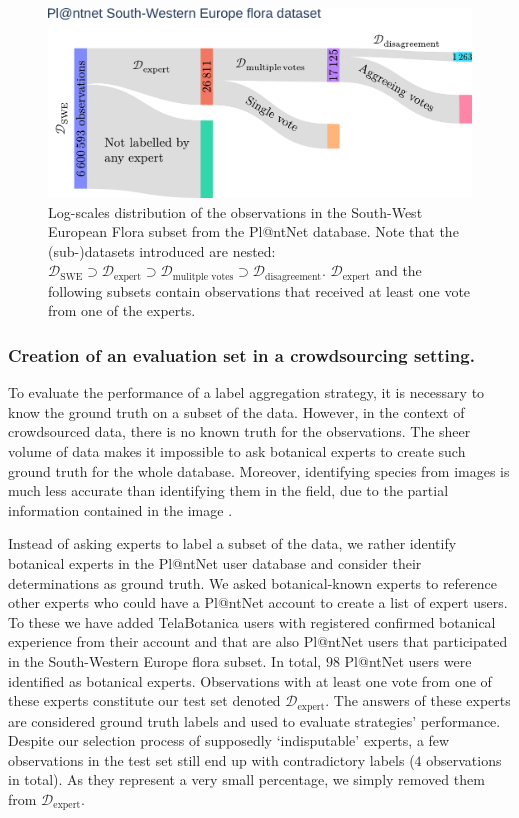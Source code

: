\begin{figure}[tbh]
    \begin{center}
        \includegraphics[width=\textwidth]{./images_plantnet/sankey_v2.pdf}
    \end{center}
    \caption{Log-scales distribution of the observations in the South-West European Flora subset from the Pl@ntNet database. Note that the (sub-)datasets introduced are nested: $\mathcal{D}_{\mathrm{SWE}} \supset \mathcal{D}_\text{expert} \supset \mathcal{D}_{\text{mulitple votes}} \supset \mathcal{D}_{\text{disagreement}}$. $\mathcal{D}_{\text{expert}}$ and the following subsets contain observations that received at least one vote from one of the experts.}
    \label{fig:sankey}
\end{figure}

\subsubsection*{Creation of an evaluation set in a crowdsourcing setting.}

To evaluate the performance of a label aggregation strategy, it is necessary to know the ground truth on a subset of the data.
However, in the context of crowdsourced data, there is no known truth for the observations.
The sheer volume of data makes it impossible to ask botanical experts to create such ground truth for the whole database.
Moreover, identifying species from images is much less accurate than identifying them in the field, due to the partial information contained in the image \citep{experts2018plant}.

Instead of asking experts to label a subset of the data, we rather identify botanical experts in the Pl@ntNet user database and consider their determinations as ground truth.
We asked botanical-known experts to reference other experts who could have a Pl@ntNet account to create a list of expert users.
To these we have added TelaBotanica \citep{heaton2010tela} users with registered confirmed botanical experience from their account and that are also Pl@ntNet users that participated in the South-Western Europe flora subset.
In total, $98$ Pl@ntNet users were identified as botanical experts.
Observations with at least one vote from one of these experts constitute our test set denoted $\mathcal{D}_\text{expert}$.
The answers of these experts are considered ground truth labels and used to evaluate strategies' performance.
Despite our selection process of supposedly `indisputable' experts, a few observations in the test set still end up with contradictory labels ($4$ observations in total). As they represent a very small percentage, we simply removed them from $\mathcal{D}_\text{expert}$.

